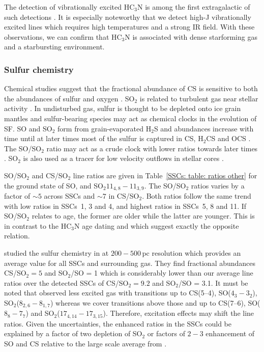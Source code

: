 The detection of vibrationally excited HC$_3$N is among the first extragalactic of such detections \citep{2010A&A...515A..71C,2011A&A...527A..36M,2011A&A...528A..30C}. It is especially noteworthy that we detect high-J vibrationally excited lines which requires high temperatures and a strong IR field. With these observations, we can confirm that HC$_3$N is associated with dense starforming gas and a starbursting environment.



\subsubsection{Sulfur chemistry}\label{SSCs: section: sulfur chemistry}

Chemical studies suggest that the fractional abundance of CS is sensitive to both the abundances of sulfur and oxygen \citep{1982ApJS...48..321G}. SO$_2$ is related to turbulent gas near stellar activity \citep{Minh:2016dx}. In undisturbed gas, sulfur is thought to be depleted onto ice grain mantles and sulfur-bearing species may act as chemical clocks in the evolution of SF. SO and SO$_2$ form from grain-evaporated H$_2$S and abundances increase with time until at later times most of the sulfur is captured in CS, H$_2$CS and OCS \citep{1998A&A...338..713H}. The SO/SO$_2$ ratio may act as a crude clock with lower ratios towards later times \citep{1997ApJ...481..396C}. SO$_2$ is also used as a tracer for low velocity outflows in stellar cores \citep{Wright:1996hi,Liu:2012ex}.

SO/SO$_2$ and CS/SO$_2$ line ratios are given in Table~\ref{SSCs: table: ratios other} for the ground state of SO, \cs and SO$_2 11_{4,8}-11_{3,9}$.
The SO/SO$_2$ ratios varies by a factor of $\sim5$ across SSCs and $\sim 7$ in CS/SO$_2$. Both ratios follow the same trend with low ratios in SSCs~1, 3 and 4, and highest ratios in SSCs~5, 8 and 11. If SO/SO$_2$ relates to age, the former are older while the latter are younger. This is in contrast to the HC$_3$N age dating and \citet{2020MNRAS.491.4573R} which suggest exactly the opposite relation.

\citet{2005ApJ...620..210M} studied the sulfur chemistry in  at $200-500$\,pc resolution which provides an average value for all SSCs and surrounding gas. They find fractional abundances CS/SO$_2 = 5$ and SO$_2$/SO = 1 which is considerably lower than our average line ratios over the detected SSCs of CS/SO$_2 = 9.2$ and SO$_2$/SO = 3.1. It must be noted that \citet{2005ApJ...620..210M} observed less excited gas with transitions up to CS(5--4), SO($4_3-3_2$), SO$_2$($8_{2,6}-8_{1,7}$) whereas we cover transitions above those and up to CS(7--6), SO($8_8-7_7$) and SO$_2$($17_{4,14}-17_{3,15}$). Therefore, excitation effects may shift the line ratios. Given the uncertainties, the enhanced ratios in the SSCs could be explained by a factor of two depletion of SO$_2$ or factors of $2-3$ enhancement of SO and CS relative to the large scale average from \citet{2005ApJ...620..210M}.


